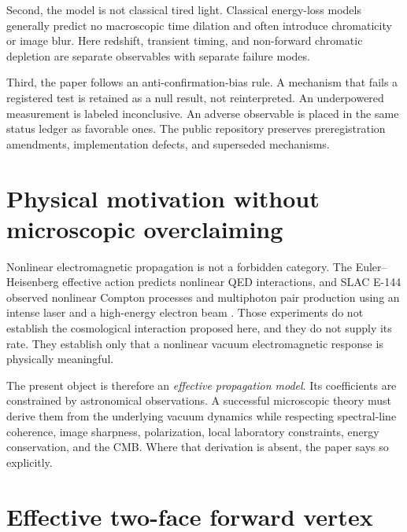 \documentclass[11pt]{article}
\begin{document}
Second, the model is not classical tired light. Classical energy-loss models generally predict no macroscopic time dilation and often introduce chromaticity or image blur. Here redshift, transient timing, and non-forward chromatic depletion are separate observables with separate failure modes.

Third, the paper follows an anti-confirmation-bias rule. A mechanism that fails a registered test is retained as a null result, not reinterpreted. An underpowered measurement is labeled inconclusive. An adverse observable is placed in the same status ledger as favorable ones. The public repository preserves preregistration amendments, implementation defects, and superseded mechanisms.

\section{Physical motivation without microscopic overclaiming}
Nonlinear electromagnetic propagation is not a forbidden category. The Euler--Heisenberg effective action predicts nonlinear QED interactions, and SLAC E-144 observed nonlinear Compton processes and multiphoton pair production using an intense laser and a high-energy electron beam \citep{Burke1997,Bamber1999}. Those experiments do not establish the cosmological interaction proposed here, and they do not supply its rate. They establish only that a nonlinear vacuum electromagnetic response is physically meaningful.

The present object is therefore an \emph{effective propagation model}. Its coefficients are constrained by astronomical observations. A successful microscopic theory must derive them from the underlying vacuum dynamics while respecting spectral-line coherence, image sharpness, polarization, local laboratory constraints, energy conservation, and the CMB. Where that derivation is absent, the paper says so explicitly.

\section{Effective two-face forward vertex}
\end{document}
